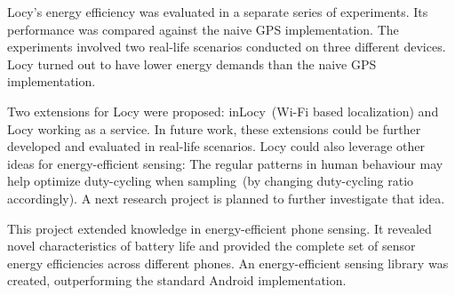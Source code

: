 Locy's energy efficiency was evaluated in a separate series of experiments. Its performance was compared against the naive GPS implementation. The experiments involved two real-life scenarios conducted on three different devices. Locy turned out to have lower energy demands than the naive GPS implementation. 

Two extensions for Locy were proposed: inLocy\ (Wi-Fi based localization) and Locy working as a service. In future work, these extensions could be further developed and evaluated in real-life scenarios. Locy could also leverage other ideas for energy-efficient sensing: The regular patterns in human behaviour may help optimize duty-cycling when sampling\ (by changing duty-cycling ratio accordingly). A next research project is planned to further investigate that idea.
		
This project extended knowledge in energy-efficient phone sensing. It revealed novel characteristics of battery life and provided the complete set of sensor energy efficiencies across different phones. An energy-efficient sensing library was created, outperforming the standard Android implementation. 
	

